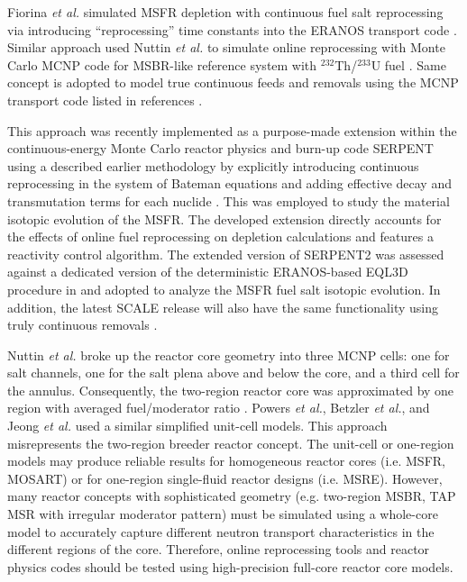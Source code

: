 Fiorina \emph{et al.} simulated 
\gls{MSFR} depletion with continuous fuel salt reprocessing via introducing 
``reprocessing'' time constants into the ERANOS transport code 
\cite{fiorina_investigation_2013}. Similar approach used Nuttin \emph{et al.} to 
simulate online reprocessing with Monte Carlo MCNP code for \gls{MSBR}-like reference 
system with $^{232}$Th/$^{233}$U fuel \cite{nuttin_potential_2005}.
Same concept is adopted to model true continuous feeds and removals using the MCNP transport code listed in references \cite{doligez_coupled_2014,heuer_towards_2014}. 

This approach was recently implemented as a purpose-made extension within the continuous-energy Monte Carlo reactor physics and burn-up code SERPENT \cite{aufiero_extended_2013} 
using a described earlier methodology by explicitly introducing 
continuous reprocessing in the system of Bateman equations and adding effective 
decay and transmutation terms for each nuclide 
\cite{aufiero_extended_2013}. This was employed to study the material isotopic evolution of the \gls{MSFR}\cite{aufiero_extended_2013}. The developed extension directly 
accounts for the effects of online fuel 
reprocessing on depletion calculations and features a reactivity control 
algorithm. The extended version of SERPENT2 was assessed against a dedicated 
version of the deterministic ERANOS-based EQL3D procedure in
\cite{ruggieri_eranos_2006, fiorina_investigation_2013} and adopted to analyze 
the \gls{MSFR} fuel salt isotopic evolution. In addition, the latest SCALE release 
will also have the same functionality using truly continuous removals \cite{betzler_implementation_2017}. 

Nuttin \emph{et al.} broke up the reactor core geometry into three \gls{MCNP} cells: 
one for salt channels, one for the salt plena above and below the core, and a 
third cell for the annulus. Consequently, the two-region reactor core was 
approximated by one region with averaged fuel/moderator ratio 
\cite{nuttin_potential_2005}.  Powers \emph{et 
al.}, Betzler \emph{et al.}, and Jeong \emph{et al.} 
\cite{powers_new_2013,powers_inventory_2014,betzler_modeling_2016, 
betzler_molten_2017, jeong_development_2014, jeong_equilibrium_2016} used a 
similar simplified unit-cell models. This approach 
misrepresents the two-region breeder reactor concept. The unit-cell or one-region 
models may produce reliable results for homogeneous reactor cores (i.e. 
\gls{MSFR}, \gls{MOSART}) or for one-region single-fluid reactor designs (i.e. 
\gls{MSRE}). However, many reactor concepts with sophisticated geometry (e.g. 
two-region \gls{MSBR}, \gls{TAP} \gls{MSR} with irregular moderator pattern) must 
be simulated using a whole-core model to accurately capture different neutron 
transport characteristics in the 
different regions of the core. Therefore, online reprocessing tools and reactor 
physics codes should be tested using high-precision full-core reactor core models.

